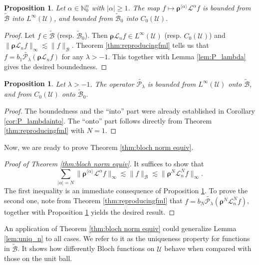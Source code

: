 \documentclass{amsart}
\newtheorem{proposition}[theorem]{Proposition}
\numberwithin{equation}{section}
\newcommand{\bfL}{\mathcal{L}}
\newcommand{\calL}{\mathcal{L}}
\newcommand{\calU}{\mathcal{U}}
\newcommand{\bfrho}{\boldsymbol{\rho}}
\newcommand{\calB}{\mathcal{B}}
\newcommand{\bbN}{\mathbb{N}}
\begin{document}
\begin{proposition}\label{lem:bddnsofder4bloch}
Let $\alpha\in\bbN_0^n$ with $|\alpha|\ge1$. The map $f\mapsto \bfrho^{\langle \alpha \rangle} \bfL^{\alpha} f$ is  bounded  from $\widetilde{\calB}$ into $L^{\infty}(\calU)$, and bounded from $\widetilde{\calB}_0$ into $C_0(\calU)$.
\end{proposition}
\begin{proof}
Let $f\in \widetilde{\calB}$ (resp. $\widetilde{\calB}_0$). 
Then $\bfrho \bfL_n f\in L^{\infty}(\calU)$ (resp. $C_0(\calU)$) and $\|\bfrho\calL_nf\|_\infty\lesssim \|f\|_{\calB}$. 
Theorem \ref{thm:reproducingfml} tells us that 
$f=  b_1  \widetilde{\mathcal{P}_{\lambda}} (\bfrho \bfL_n f)$
for any $\lambda>-1$. This together with Lemma \ref{lem:P_lambda} gives the desired boundedness.
\end{proof}

 \begin{proposition}\label{cor:BPL}
Let $\lambda>-1$. The operator $\widetilde{\mathcal{P}_\lambda}$ is bounded from $L^{\infty}(\calU)$ onto $\widetilde{\calB}$, and from $C_0(\calU)$ onto $\widetilde{\calB}_0$.
\end{proposition}
\begin{proof}
The boundedness and the ``into'' part were already established in Corollary \ref{cor:P_lambdainto}.
The ``onto'' part follows directly from Theorem \ref{thm:reproducingfml} with $N=1$.
\end{proof}

Now, we are ready to prove Theorem \ref{thm:bloch norm equiv}.

\begin{proof}[Proof of Theorem \ref{thm:bloch norm equiv}]
It suffices to show that 
\begin{equation*}\label{eqn:thm:bloch norm equiv}
\sum_{|\alpha | = N} \| \bfrho^{\langle \alpha \rangle} \bfL^{\alpha} f\|_{\infty}
\lesssim \|f\|_{\calB} \lesssim \|\bfrho^N \bfL_n^N f\|_{\infty}.
\end{equation*}
The first inequality is an immediate consequence of Proposition \ref{lem:bddnsofder4bloch}.
To prove the second one, note from Theorem \ref{thm:reproducingfml} that
$f=  b_N \widetilde{\mathcal{P}_{\lambda}} (\bfrho^N \bfL_n^N f)$,
together with Proposition \ref{cor:BPL} yields the desired result.
\end{proof}


An application of Theorem \ref{thm:bloch norm equiv} could generalize Lemma \ref{lem:uniq_n} to all cases.
We refer to it as the uniqueness property for functions in $\widetilde{\calB}$. It shows how differently Bloch functions on $\calU$ behave when compared with those on the unit ball. 
\end{document}

